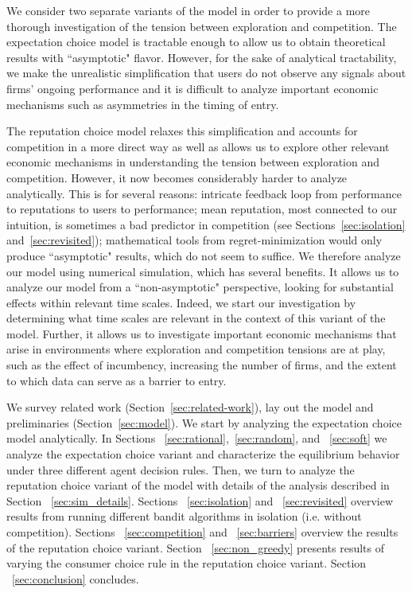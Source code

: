 We consider two separate variants of the model in order to provide a more thorough investigation of the tension between exploration and competition. The expectation choice model is tractable enough to allow us to obtain theoretical results with ``asymptotic" flavor. However, for the sake of analytical tractability, we make the unrealistic simplification that users do not observe any signals about firms' ongoing performance and it is difficult to analyze important economic mechanisms such as asymmetries in the timing of entry.

The reputation choice model relaxes this simplification and accounts for competition in a more direct way as well as allows us to explore other relevant economic mechanisms in understanding the tension between exploration and competition. However, it now becomes considerably harder to analyze analytically. This is for several reasons: intricate feedback loop from performance to reputations to users to performance;
%
mean reputation, most connected to our intuition, is sometimes a bad predictor in competition (see Sections~\ref{sec:isolation} and~\ref{sec:revisited});
%
mathematical tools from regret-minimization would only produce ``asymptotic" results, which do not seem to suffice. We therefore analyze our model using numerical simulation, which has several benefits. It allows us to analyze our model from a ``non-asymptotic" perspective, looking for substantial effects within relevant time scales. Indeed, we start our investigation by determining what time scales are relevant in the context of this variant of the model. Further, it allows us to investigate important economic mechanisms that arise in environments where exploration and competition tensions are at play, such as the effect of incumbency, increasing the number of firms, and the extent to which data can serve as a barrier to entry.

We survey related work (Section~\ref{sec:related-work}), lay out the model and preliminaries (Section~\ref{sec:model}). We start by analyzing the expectation choice model analytically. In Sections ~\ref{sec:rational},~\ref{sec:random}, and ~\ref{sec:soft} we analyze the expectation choice variant and characterize the equilibrium behavior under three different agent decision rules. Then, we turn to analyze the reputation choice variant of the model with details of the analysis described in Section ~\ref{sec:sim_details}. Sections ~\ref{sec:isolation} and ~\ref{sec:revisited} overview results from running different bandit algorithms in isolation (i.e. without competition). Sections ~\ref{sec:competition} and ~\ref{sec:barriers} overview the results of the reputation choice variant. Section ~\ref{sec:non_greedy} presents results of varying the consumer choice rule in the reputation choice variant. Section ~\ref{sec:conclusion} concludes.


